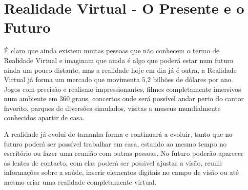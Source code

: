 \chapter{Realidade Virtual - O Presente e o Futuro}


É claro que ainda existem muitas pessoas que não conhecem o termo de Realidade Virtual e imaginam que ainda é algo que poderá estar num futuro ainda um pouco distante, mas a realidade hoje em dia já é outra, a Realidade Virtual já forma um mercado que movimenta 5,2 bilhões de dólares por ano. Jogos com precisão e realismo impressionantes, filmes completamente imersivos num ambiente em 360 graus, concertos onde será possível andar perto do cantor favorito, parques de diversões simulados, visitas a museus mundialmente conhecidos apartir de casa.

A realidade já evolui de tamanha forma e continuará a evoluir, tanto que no futuro poderá ser possível trabalhar em casa, estando ao mesmo tempo no escritório ou fazer uma reunião com outras pessoas. No futuro poderão aparecer as lentes de contacto, com elas poderá ser possivel ajustar a visão, reunir informações sobre a saúde, inserir elementos digitais no campo de visão ou até mesmo criar uma realidade completamente virtual.




	



